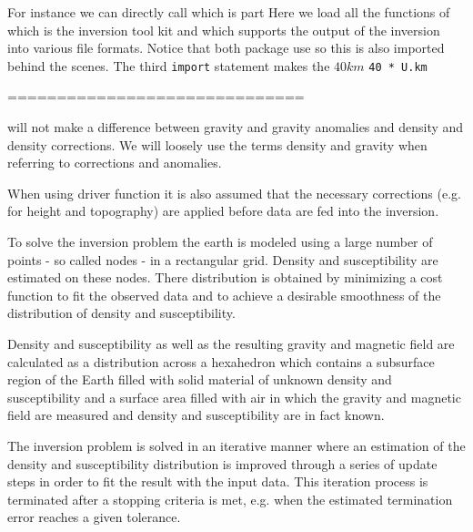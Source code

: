 For instance we can
directly call which is part  Here we 
load all the functions of \downunder which is the inversion tool kit and \weipa which supports the output 
of the inversion into various file formats. Notice that both package use \escript so this is also imported behind the scenes.
The third \verb|import| statement makes the 
$40 km$
\verb|40 * U.km| 
 

 

 

==============================

will not make a difference between gravity and gravity anomalies 
and density and density corrections. We will loosely use the terms density and gravity when referring to corrections and anomalies.  

When using \downunder driver function it is also assumed that the necessary corrections (e.g. for height and topography) are applied 
before data are fed into the inversion. 
 
To solve the inversion problem 
the earth is modeled using a large number of points - so called nodes - in a rectangular grid.
Density and susceptibility are estimated on these nodes. 
There distribution is obtained by minimizing a cost function to fit the observed data and to achieve 
a desirable smoothness of the distribution of density and susceptibility. 

 

Density and susceptibility as well as the resulting gravity and magnetic field
are calculated as a distribution across a hexahedron which contains a subsurface region of the Earth filled
with solid material of unknown density and susceptibility and a surface area filled with air 
in which the gravity and magnetic field are measured and density and susceptibility are in fact known.

The inversion problem is solved in an iterative manner 
where an estimation of the density and susceptibility distribution
is improved through a series of update steps in order to fit the result with the input data. 
This iteration process is terminated after a stopping criteria is met, e.g. when the estimated 
termination error reaches a given tolerance.





